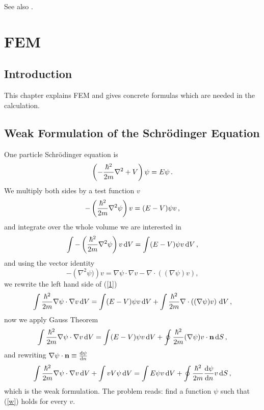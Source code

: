 See also \cite{blochl}.

\section{FEM}

\subsection{Introduction}

This chapter explains FEM and gives concrete formulas which are needed in the calculation.

\subsection{Weak Formulation of the Schrödinger Equation}

One particle Schrödinger equation is 
\begin{equation*}
  \left(-{\hbar^2\over2m}\nabla^2 + V\right)\psi=E\psi\,.
\end{equation*}
We multiply both sides by a test function $v$
\begin{equation*}
  -\left({\hbar^2\over2m}\nabla^2\psi\right)v=(E-V)\psi v\,,
\end{equation*}
and integrate over the whole volume we are interested in 
\begin{equation}
  \int-\left({\hbar^2\over2m}\nabla^2\psi\right)v\,{\rm d} V=\int(E-V)\psi v\,{\rm d} V\,,  \label{1}
\end{equation}
and using the vector identity 
\begin{equation*}
  -\left(\nabla^2\psi)\right)v=\nabla \psi\cdot \nabla v - \nabla\cdot\left((\nabla \psi)v\right),
\end{equation*}
we rewrite the left hand side of (\ref{1})
\begin{equation*}
  \int{\hbar^2\over2m}\nabla\psi\cdot\nabla v\,{\rm d} V=\int(E-V)\psi v\,{\rm d} V+\int{\hbar^2\over2m}\nabla\cdot\left((\nabla \psi)v\right)\,{\rm d} V\,,
\end{equation*}
now we apply Gauss Theorem 
\begin{equation*}
  \int{\hbar^2\over2m}\nabla\psi\cdot\nabla v\,{\rm d} V=\int(E-V)\psi v\,{\rm d} V+\oint{\hbar^2\over2m}(\nabla \psi)v\cdot{\bf n}\,{\rm d} S\,,
\end{equation*}
and rewriting $\nabla\psi\cdot{\bf n}\equiv{{\rm d}\psi\over{\rm d}n}$
\begin{equation}
  \int{\hbar^2\over2m}\nabla\psi\cdot\nabla v\,{\rm d} V+ \int vV\psi\,{\rm d} V = \int E\psi v\,{\rm d} V + \oint{\hbar^2\over2m}{{\rm d}\psi\over{\rm d}n}v\,{\rm d} S\,,  \label{w}
\end{equation}
which is the weak formulation. The problem reads: find a function $\psi$ such that (\ref{w}) holds for every $v$.

